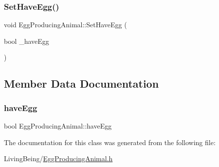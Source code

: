 \subsubsection{\texorpdfstring{SetHaveEgg()}{SetHaveEgg()}}
{\footnotesize\ttfamily void Egg\+Producing\+Animal\+::\+Set\+Have\+Egg (\begin{DoxyParamCaption}\item[{bool}]{\+\_\+have\+Egg }\end{DoxyParamCaption})}



\subsection{Member Data Documentation}
\mbox{\label{classEggProducingAnimal_adba93a141ce347708ae9341c6a2f5a7e}} 
\subsubsection{\texorpdfstring{haveEgg}{haveEgg}}
{\footnotesize\ttfamily bool Egg\+Producing\+Animal\+::have\+Egg\hspace{0.3cm}{\ttfamily [protected]}}



The documentation for this class was generated from the following file\+:\begin{DoxyCompactItemize}
\item 
Living\+Being/\mbox{\hyperlink{EggProducingAnimal_8h}{Egg\+Producing\+Animal.\+h}}\end{DoxyCompactItemize}
